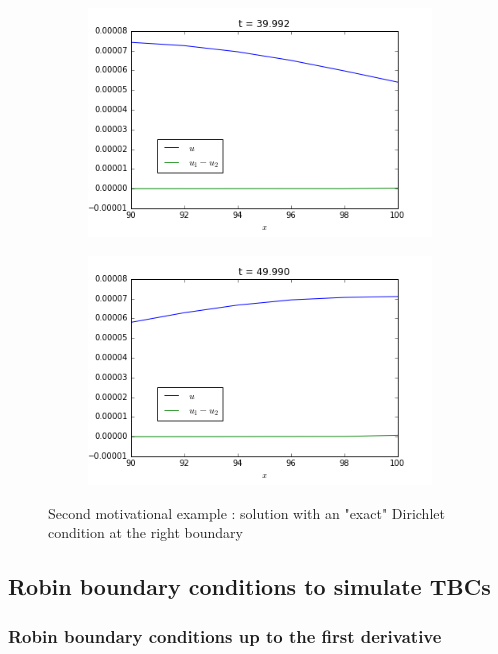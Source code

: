 \begin{figure}[h]
	\begin{subfigure}{.5\linewidth}
		\includegraphics[scale=.5]{figures/motivational2A.png}	
	\end{subfigure}
	\begin{subfigure}{.5\linewidth}
		\includegraphics[scale=.5]{figures/motivational2B.png}	
	\end{subfigure}
	\caption{Second motivational example : solution with an "exact" Dirichlet condition at the right boundary \label{fig:motivation2}}
\end{figure}

\subsection{Robin boundary conditions to simulate TBCs}

\subsubsection{Robin boundary conditions up to the first derivative}

